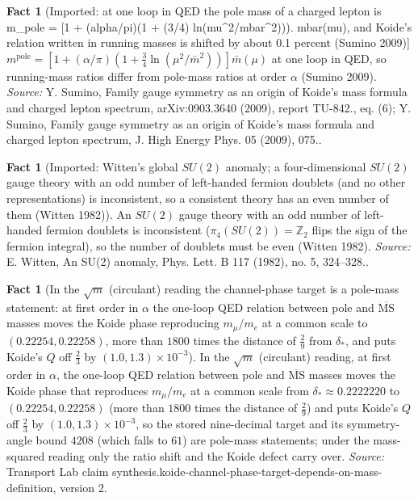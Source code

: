 \documentclass[11pt]{article}
\theoremstyle{definition}
\newtheorem{fact}[theorem]{Fact}
\theoremstyle{plain}
\begin{document}
\begin{fact}[Imported: at one loop in QED the pole mass of a charged lepton is m\_pole = [1 + (alpha/pi)(1 + (3/4) ln(mu\^{}2/mbar\^{}2))] mbar(mu), and Koide's relation written in running masses is shifted by about 0.1 percent (Sumino 2009)]\label{c:synthesis.imported-one-loop-qed-pole-mass-relation}
$m^{\mathrm{pole}} = [1 + (\alpha/\pi)(1 + \tfrac34\ln(\mu^{2}/\bar{m}^{2}))]\bar{m}(\mu)$ at one loop in QED, so running-mass ratios differ from pole-mass ratios at order $\alpha$ (Sumino 2009).
\emph{Source:} Y. Sumino, Family gauge symmetry as an origin of Koide's mass formula and charged lepton spectrum, arXiv:0903.3640 (2009), report TU-842., eq. (6); Y. Sumino, Family gauge symmetry as an origin of Koide's mass formula and charged lepton spectrum, J. High Energy Phys. 05 (2009), 075..
\end{fact}

\begin{fact}[Imported: Witten's global $SU(2)$ anomaly; a four-dimensional $SU(2)$ gauge theory with an odd number of left-handed fermion doublets (and no other representations) is inconsistent, so a consistent theory has an even number of them (Witten 1982)]\label{c:synthesis.imported-witten-global-su2-anomaly}
An $SU(2)$ gauge theory with an odd number of left-handed fermion doublets is inconsistent ($\pi_{4}(SU(2)) = \mathbb{Z}_{2}$ flips the sign of the fermion integral), so the number of doublets must be even (Witten 1982).
\emph{Source:} E. Witten, An SU(2) anomaly, Phys. Lett. B 117 (1982), no. 5, 324--328..
\end{fact}

\begin{fact}[In the $\sqrt{m}$ (circulant) reading the channel-phase target is a pole-mass statement: at first order in $\alpha$ the one-loop QED relation between pole and $\overline{\mathrm{MS}}$ masses moves the Koide phase reproducing $m_{\mu}/m_{e}$ at a common scale to $(0.22254, 0.22258)$, more than $1800$ times the distance of $\tfrac29$ from $\delta_{*}$, and puts Koide's $Q$ off $\tfrac23$ by $(1.0, 1.3) \times 10^{-3}$]\label{c:synthesis.koide-channel-phase-target-depends-on-mass-definition}
In the $\sqrt{m}$ (circulant) reading, at first order in $\alpha$, the one-loop QED relation between pole and $\overline{\mathrm{MS}}$ masses moves the Koide phase that reproduces $m_{\mu}/m_{e}$ at a common scale from $\delta_{*} \approx 0.2222220$ to $(0.22254, 0.22258)$ (more than $1800$ times the distance of $\tfrac29$) and puts Koide's $Q$ off $\tfrac23$ by $(1.0, 1.3) \times 10^{-3}$, so the stored nine-decimal target and its symmetry-angle bound $4208$ (which falls to $61$) are pole-mass statements; under the mass-squared reading only the ratio shift and the Koide defect carry over.
\emph{Source:} Transport Lab claim synthesis.koide-channel-phase-target-depends-on-mass-definition, version 2.
\end{fact}
\end{document}
